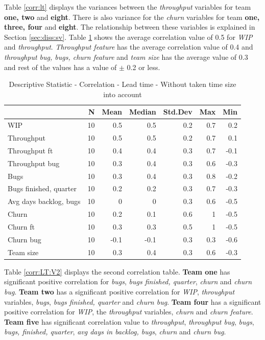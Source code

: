 \documentclass[UKenglish]{ifimaster}  %
\begin{document}
Table \ref{corr:lt} displays the variances between the \textit{throughput} variables for team \textbf{one, two} and \textbf{eight}. There is also variance for the \textit{churn} variables for team \textbf{one, three, four} and \textbf{eight}. The relationship between these variables is explained in Section \ref{sec:diss:sv}. Table \ref{DS:corr:LT} shows the average correlation value of 0.5 for \textit{WIP} and \textit{throughput}. \textit{Throughput feature} has the average correlation value of 0.4 and \textit{throughput bug, bugs, churn feature} and \textit{team size} has the average value of 0.3 and rest of the values has a value of $\pm$ 0.2 or less.



\begin{table}[H]
 \centering
 \begin{tabular}{ | l | r | r | r | r | r | r | }
 \hline
 & \bf{N} & \bf{Mean} & \bf{Median} & \bf{Std.Dev} & \bf{Max} & \bf{Min} \\ \hline
WIP  & 10 & 0.5 & 0.5 & 0.2 & 0.7 & 0.2\\ \hline
Throughput  & 10 & 0.5 & 0.5 & 0.2 & 0.7 & 0.1\\ \hline
Throughput ft  & 10 & 0.4 & 0.4 & 0.3 & 0.7 & -0.1\\ \hline
Throughput bug  & 10 & 0.3 & 0.4 & 0.3 & 0.6 & -0.3\\ \hline
Bugs  & 10 & 0.3 & 0.4 & 0.3 & 0.8 & -0.2\\ \hline
Bugs finished, quarter  & 10 & 0.2 & 0.2 & 0.3 & 0.7 & -0.3\\ \hline
Avg days backlog, bugs  & 10 & 0 & 0 & 0.3 & 0.6 & -0.5\\ \hline
Churn  & 10 & 0.2 & 0.1 & 0.6 & 1 & -0.5\\ \hline
Churn ft  & 10 & 0.3 & 0.3 & 0.5 & 1 & -0.5\\ \hline
Churn bug  & 10 & -0.1 & -0.1 & 0.3 & 0.3 & -0.6\\ \hline
Team size  & 10 & 0.3 & 0.4 & 0.3 & 0.6 & -0.3\\ \hline
\end{tabular}
 \caption{Descriptive Statistic - Correlation - Lead time - Without taken time size into account}
 \label{DS:corr:LT}
 \end{table}

Table \ref{corr:LT:V2} displays the second correlation table. \textbf{Team one} has significant positive correlation for \textit{bugs}, \textit{bugs finished, quarter}, \textit{churn} and \textit{churn bug}. \textbf{Team two} has a significant positive correlation for  \textit{WIP}, \textit{throughput} variables, \textit{bugs}, \textit{bugs finished, quarter} and \textit{churn bug}.  \textbf{Team four} has a significant positive correlation for \textit{WIP}, the \textit{throughput} variables, \textit{churn} and \textit{churn feature}. \textbf{Team five} has significant correlation value to \textit{throughput}, \textit{throughput bug}, \textit{bugs}, \textit{bugs, finished, quarter}, \textit{avg days in backlog, bugs}, \textit{churn} and \textit{churn bug}.
\end{document}
